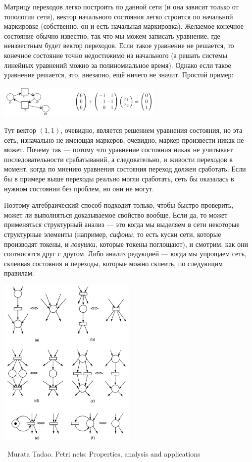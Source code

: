 \documentclass[a5paper]{article}
\newcommand{\attribution}[1] {
    \vspace{-5mm}\begin{flushright}\begin{scriptsize}%
    {\textcopyright\, #1}\end{scriptsize}\end{flushright}
}
\begin{document}
Матрицу переходов легко построить по данной сети (и она зависит только от топологии сети), вектор начального состояния легко строится по начальной маркировке (собственно, он и есть начальная маркировка). Желаемое конечное состояние обычно известно, так что мы можем записать уравнение, где неизвестным будет вектор переходов. Если такое уравнение не решается, то конечное состояние точно недостижимо из начального (а решать системы линейных уравнений можно за полиномиальное время). Однако если такое уравнение решается, это, внезапно, ещё ничего не значит. Простой пример:

\begin{center}
    \includegraphics[width=0.6\textwidth]{algebraicAnalysisFail.png}
\end{center}

Тут вектор $(1, 1)$, очевидно, является решением уравнения состояния, но эта сеть, изначально не имеющая маркеров, очевидно, маркер произвести никак не может. Почему так --- потому что уравнение состояния никак не учитывает последовательности срабатываний, а следовательно, и живости переходов в момент, когда по мнению уравнения состояния переход должен сработать. Если бы в примере выше переходы реально могли сработать, сеть бы оказалась в нужном состоянии без проблем, но они не могут.

Поэтому алгебраический способ подходит только, чтобы быстро проверить, может ли выполняться доказываемое свойство вообще. Если да, то может применяться структурный анализ --- это когда мы выделяем в сети некоторые структурные элементы (например, \textit{сифоны}, то есть куски сети, которые производят токены, и \textit{ловушки}, которые токены поглощают), и смотрим, как они соотносятся друг с другом. Либо анализ редукцией --- когда мы упрощаем сеть, склеивая состояния и переходы, которые можно склеить, по следующим правилам:

\begin{center}
    \includegraphics[width=0.5\textwidth]{petriReduction.png}
    \attribution{Murata Tadao. Petri nets: Properties, analysis and applications}
\end{center}
\end{document}
